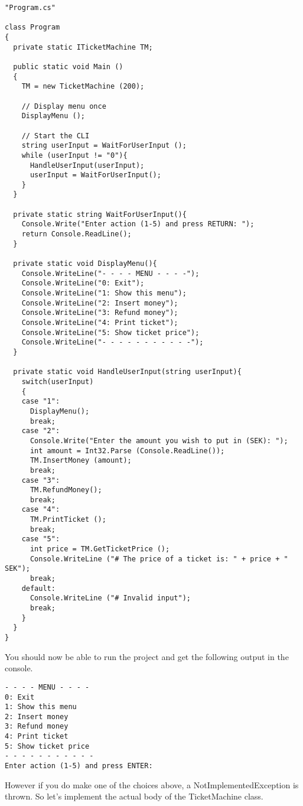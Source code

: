 \documentclass{article}
\begin{document}
\begin{lstlisting}
"Program.cs"

class Program
{
  private static ITicketMachine TM;
  
  public static void Main ()
  {
    TM = new TicketMachine (200);
    
    // Display menu once
    DisplayMenu ();

    // Start the CLI
    string userInput = WaitForUserInput ();
    while (userInput != "0"){
      HandleUserInput(userInput);
      userInput = WaitForUserInput();
    }
  }
  
  private static string WaitForUserInput(){
    Console.Write("Enter action (1-5) and press RETURN: ");
    return Console.ReadLine();
  }

  private static void DisplayMenu(){
    Console.WriteLine("- - - - MENU - - - -");
    Console.WriteLine("0: Exit");
    Console.WriteLine("1: Show this menu");
    Console.WriteLine("2: Insert money");
    Console.WriteLine("3: Refund money");
    Console.WriteLine("4: Print ticket");
    Console.WriteLine("5: Show ticket price");
    Console.WriteLine("- - - - - - - - - - -");
  }
  
  private static void HandleUserInput(string userInput){
    switch(userInput)
    {
    case "1":
      DisplayMenu();
      break;
    case "2":
      Console.Write("Enter the amount you wish to put in (SEK): ");
      int amount = Int32.Parse (Console.ReadLine());
      TM.InsertMoney (amount);
      break;
    case "3":
      TM.RefundMoney();
      break;
    case "4":
      TM.PrintTicket ();
      break;
    case "5":
      int price = TM.GetTicketPrice ();
      Console.WriteLine ("# The price of a ticket is: " + price + " SEK");
      break;
    default:
      Console.WriteLine ("# Invalid input");
      break;
    }
  }
}
\end{lstlisting}


You should now be able to run the project and get the following output in the console.

\begin{lstlisting}[style=terminal]
- - - - MENU - - - -
0: Exit
1: Show this menu
2: Insert money
3: Refund money
4: Print ticket
5: Show ticket price
- - - - - - - - - - -
Enter action (1-5) and press ENTER: 
\end{lstlisting}
However if you do make one of the choices above, a NotImplementedException is thrown.  So let’s implement the actual body of the TicketMachine class.
\end{document}

